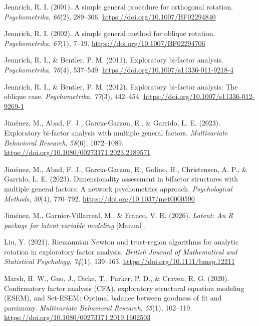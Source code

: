 \documentclass[
  12pt,
  letterpaper,
  article]{scrartcl}
\newlength{\cslhangindent}
\newenvironment{CSLReferences}[2] %
 {\begin{list}{}{%
  \setlength{\itemindent}{0pt}
  \setlength{\leftmargin}{0pt}
  \setlength{\parsep}{0pt}
  \ifodd #1
   \setlength{\leftmargin}{\cslhangindent}
   \setlength{\itemindent}{-1\cslhangindent}
  \fi
  \setlength{\itemsep}{#2\baselineskip}}}
 {\end{list}}
\begin{document}
\begin{CSLReferences}{1}{0}
Jennrich, R. I. (2001). A simple general procedure for orthogonal
rotation. \emph{Psychometrika}, \emph{66}(2), 289--306.
\url{https://doi.org/10.1007/BF02294840}

Jennrich, R. I. (2002). A simple general method for oblique rotation.
\emph{Psychometrika}, \emph{67}(1), 7--19.
\url{https://doi.org/10.1007/BF02294706}

Jennrich, R. I., \& Bentler, P. M. (2011). Exploratory bi-factor
analysis. \emph{Psychometrika}, \emph{76}(4), 537--549.
\url{https://doi.org/10.1007/s11336-011-9218-4}

Jennrich, R. I., \& Bentler, P. M. (2012). Exploratory bi-factor
analysis: {The} oblique case. \emph{Psychometrika}, \emph{77}(3),
442--454. \url{https://doi.org/10.1007/s11336-012-9269-1}

Jiménez, M., Abad, F. J., Garcia-Garzon, E., \& Garrido, L. E. (2023).
Exploratory bi-factor analysis with multiple general factors.
\emph{Multivariate Behavioral Research}, \emph{58}(6), 1072--1089.
\url{https://doi.org/10.1080/00273171.2023.2189571}

Jiménez, M., Abad, F. J., Garcia-Garzon, E., Golino, H., Christensen, A.
P., \& Garrido, L. E. (2023). Dimensionality assessment in bifactor
structures with multiple general factors: {A} network psychometrics
approach. \emph{Psychological Methods}, \emph{30}(4), 770--792.
\url{https://doi.org/10.1037/met0000590}

Jiménez, M., Garnier-Villarreal, M., \& Franco, V. R. (2026).
\emph{Latent: {An R} package for latent variable modeling} {[}Manual{]}.

Liu, Y. (2021). Riemannian {Newton} and trust-region algorithms for
analytic rotation in exploratory factor analysis. \emph{British Journal
of Mathematical and Statistical Psychology}, \emph{74}(1), 139--163.
\url{https://doi.org/10.1111/bmsp.12211}

Marsh, H. W., Guo, J., Dicke, T., Parker, P. D., \& Craven, R. G.
(2020). Confirmatory factor analysis ({CFA}), exploratory structural
equation modeling ({ESEM}), and {Set-ESEM}: {Optimal} balance between
goodness of fit and parsimony. \emph{Multivariate Behavioral Research},
\emph{55}(1), 102--119.
\url{https://doi.org/10.1080/00273171.2019.1602503}


\end{CSLReferences}
\end{document}
